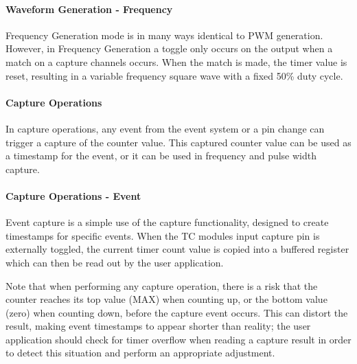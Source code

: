 \label{group__asfdoc__sam0__tc__group_asfdoc_sam0_tc_module_pwm_match_diag}%
%
  \hypertarget{group__asfdoc__sam0__tc__group_asfdoc_sam0_tc_module_overview_compare_match_wg_freq}{}\paragraph{Waveform Generation -\/ Frequency}\label{group__asfdoc__sam0__tc__group_asfdoc_sam0_tc_module_overview_compare_match_wg_freq}
Frequency Generation mode is in many ways identical to P\+WM generation. However, in Frequency Generation a toggle only occurs on the output when a match on a capture channels occurs. When the match is made, the timer value is reset, resulting in a variable frequency square wave with a fixed 50\% duty cycle.\hypertarget{group__asfdoc__sam0__tc__group_asfdoc_sam0_tc_module_overview_compare_match_capt}{}\paragraph{Capture Operations}\label{group__asfdoc__sam0__tc__group_asfdoc_sam0_tc_module_overview_compare_match_capt}
In capture operations, any event from the event system or a pin change can trigger a capture of the counter value. This captured counter value can be used as a timestamp for the event, or it can be used in frequency and pulse width capture.\hypertarget{group__asfdoc__sam0__tc__group_asfdoc_sam0_tc_module_overview_compare_match_capt_event_capture}{}\paragraph{Capture Operations -\/ Event}\label{group__asfdoc__sam0__tc__group_asfdoc_sam0_tc_module_overview_compare_match_capt_event_capture}
Event capture is a simple use of the capture functionality, designed to create timestamps for specific events. When the TC module\textquotesingle{}s input capture pin is externally toggled, the current timer count value is copied into a buffered register which can then be read out by the user application.

Note that when performing any capture operation, there is a risk that the counter reaches its top value (M\+AX) when counting up, or the bottom value (zero) when counting down, before the capture event occurs. This can distort the result, making event timestamps to appear shorter than reality; the user application should check for timer overflow when reading a capture result in order to detect this situation and perform an appropriate adjustment.

